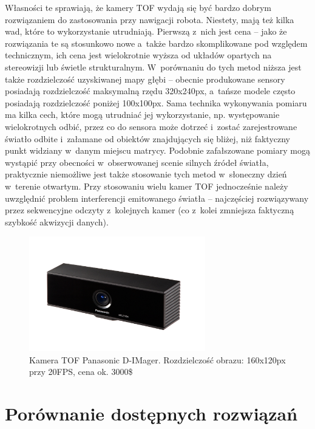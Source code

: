 Własności te sprawiają, że kamery TOF wydają się być bardzo dobrym rozwiązaniem
do zastosowania przy nawigacji robota. Niestety, mają też kilka wad, które to
wykorzystanie utrudniają. Pierwszą z~nich jest cena -- jako że rozwiązania te są
stosunkowo nowe a~także bardzo skomplikowane pod względem technicznym, ich cena
jest wielokrotnie wyższa od układów opartych na stereowizji lub świetle
strukturalnym. W~porównaniu do tych metod niższa jest także rozdzielczość
uzyskiwanej mapy głębi -- obecnie produkowane sensory posiadają rozdzielczość
maksymalną rzędu 320x240px, a~tańsze modele często posiadają rozdzielczość
poniżej 100x100px. Sama technika wykonywania pomiaru ma kilka cech, które mogą
utrudniać jej wykorzystanie, np. występowanie wielokrotnych odbić, przez co
do sensora może dotrzeć i~zostać zarejestrowane światło odbite i~załamane od
obiektów znajdujących się bliżej, niż faktyczny punkt widziany w~danym miejscu
matrycy. Podobnie zafałszowane pomiary mogą wystąpić przy obecności 
w~obserwowanej scenie silnych źródeł światła, praktycznie niemożliwe jest także
stosowanie tych metod w~słoneczny dzień w~terenie otwartym. Przy stosowaniu
wielu kamer TOF jednocześnie należy uwzględnić problem interferencji emitowanego
światła -- najczęściej rozwiązywany przez sekwencyjne odczyty z~kolejnych kamer
(co z~kolei zmniejsza faktyczną szybkość akwizycji danych).

\begin{figure}[h!]
\centering
\includegraphics[height=5cm]{../../Common/img/dimager}
\caption[Kamera TOF Panasonic D-IMager]{Kamera TOF Panasonic D-IMager.
Rozdzielczość obrazu: 160x120px przy 20FPS, cena ok. 3000\$}
\label{fig:dimager}
\end{figure}

\section{Porównanie dostępnych rozwiązań}

